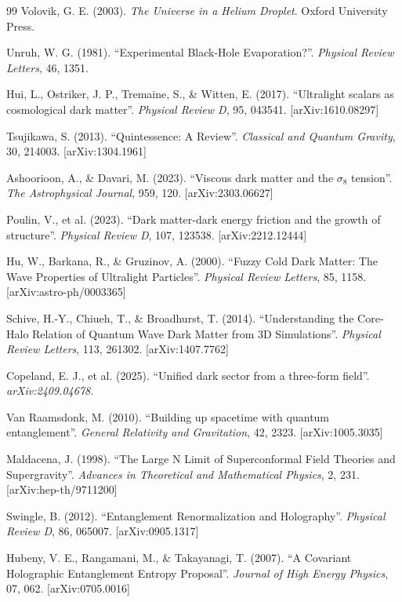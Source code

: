 \documentclass[12pt,a4paper]{book}
\begin{document}
\begin{thebibliography}{99}
 Volovik, G. E. (2003). \textit{The Universe in a Helium Droplet}. Oxford University Press.

 Unruh, W. G. (1981). ``Experimental Black-Hole Evaporation?''. \textit{Physical Review Letters}, 46, 1351.

 Hui, L., Ostriker, J. P., Tremaine, S., \& Witten, E. (2017). ``Ultralight scalars as cosmological dark matter''. \textit{Physical Review D}, 95, 043541. [arXiv:1610.08297]

 Tsujikawa, S. (2013). ``Quintessence: A Review''. \textit{Classical and Quantum Gravity}, 30, 214003. [arXiv:1304.1961]

 Ashoorioon, A., \& Davari, M. (2023). ``Viscous dark matter and the $\sigma_8$ tension''. \textit{The Astrophysical Journal}, 959, 120. [arXiv:2303.06627]

 Poulin, V., et al. (2023). ``Dark matter-dark energy friction and the growth of structure''. \textit{Physical Review D}, 107, 123538. [arXiv:2212.12444]

 Hu, W., Barkana, R., \& Gruzinov, A. (2000). ``Fuzzy Cold Dark Matter: The Wave Properties of Ultralight Particles''. \textit{Physical Review Letters}, 85, 1158. [arXiv:astro-ph/0003365]

 Schive, H.-Y., Chiueh, T., \& Broadhurst, T. (2014). ``Understanding the Core-Halo Relation of Quantum Wave Dark Matter from 3D Simulations''. \textit{Physical Review Letters}, 113, 261302. [arXiv:1407.7762]

 Copeland, E. J., et al. (2025). ``Unified dark sector from a three-form field''. \textit{arXiv:2409.04678}.

 Van Raamsdonk, M. (2010). ``Building up spacetime with quantum entanglement''. \textit{General Relativity and Gravitation}, 42, 2323. [arXiv:1005.3035]

 Maldacena, J. (1998). ``The Large N Limit of Superconformal Field Theories and Supergravity''. \textit{Advances in Theoretical and Mathematical Physics}, 2, 231. [arXiv:hep-th/9711200]

 Swingle, B. (2012). ``Entanglement Renormalization and Holography''. \textit{Physical Review D}, 86, 065007. [arXiv:0905.1317]

 Hubeny, V. E., Rangamani, M., \& Takayanagi, T. (2007). ``A Covariant Holographic Entanglement Entropy Proposal''. \textit{Journal of High Energy Physics}, 07, 062. [arXiv:0705.0016]


\end{thebibliography}
\end{document}
